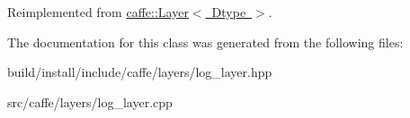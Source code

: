 Reimplemented from \mbox{\hyperlink{classcaffe_1_1_layer_a481323a3e0972c682787f2137468c29f}{caffe\+::\+Layer$<$ Dtype $>$}}.



The documentation for this class was generated from the following files\+:\begin{DoxyCompactItemize}
\item 
build/install/include/caffe/layers/log\+\_\+layer.\+hpp\item 
src/caffe/layers/log\+\_\+layer.\+cpp\end{DoxyCompactItemize}
